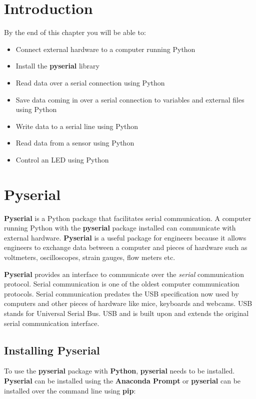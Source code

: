 \documentclass{book}
\begin{document}
    \section{Introduction}\label{introduction}

    By the end of this chapter you will be able to:

\begin{itemize}
\item
  Connect external hardware to a computer running Python
\item
  Install the \textbf{pyserial} library
\item
  Read data over a serial connection using Python
\item
  Save data coming in over a serial connection to variables and external
  files using Python
\item
  Write data to a serial line using Python
\item
  Read data from a sensor using Python
\item
  Control an LED using Python
\end{itemize}

    \section{Pyserial}\label{pyserial}

    \textbf{Pyserial} is a Python package that facilitates serial
communication. A computer running Python with the \textbf{pyserial}
package installed can communicate with external hardware.
\textbf{Pyserial} is a useful package for engineers because it allows
engineers to exchange data between a computer and pieces of hardware
such as voltmeters, oscilloscopes, strain gauges, flow meters etc.

\textbf{Pyserial} provides an interface to communicate over the
\emph{serial} communication protocol. Serial communication is one of the
oldest computer communication protocols. Serial communication predates
the USB specification now used by computers and other pieces of hardware
like mice, keyboards and webcams. USB stands for Universal Serial Bus.
USB and is built upon and extends the original serial communication
interface.

    \subsection{Installing Pyserial}\label{installing-pyserial}

    To use the \textbf{pyserial} package with \textbf{Python},
\textbf{pyserial} needs to be installed. \textbf{Pyserial} can be
installed using the \textbf{Anaconda Prompt} or \textbf{pyserial} can be
installed over the command line using \textbf{pip}:
\end{document}
